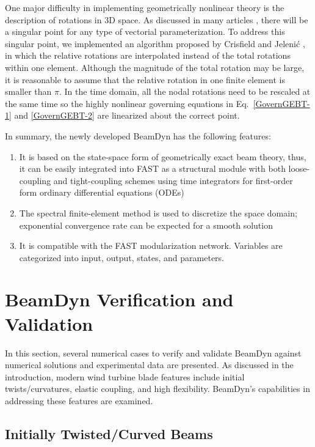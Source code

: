 \documentclass{aiaa-tc}
\begin{document}
One major difficulty in implementing geometrically nonlinear theory is the description of rotations in 3D space. As discussed in many articles \cite{Crisfield:1999,Bauchau:2010,Bottasso:1998}, there will be a singular point for any type of vectorial parameterization. To address this singular point, we implemented an algorithm proposed by Crisfield and Jeleni\'c \cite{Crisfield:1999}, in which the relative rotations are interpolated instead of the total rotations within one element. Although the magnitude of the total rotation may be large, it is reasonable to assume that the relative rotation in one finite element is smaller than $\pi$. In the time domain, all the nodal rotations need to be rescaled at the same time so the highly nonlinear governing equations in Eq.~\eqref{GovernGEBT-1} and \eqref{GovernGEBT-2} are linearized about the correct point.

In summary, the newly developed BeamDyn has the following features: 
\begin{enumerate}
    \item It is based on the state-space form of geometrically exact beam theory, thus, it can be easily integrated into FAST as a structural module with both loose-coupling and tight-coupling schemes using time integrators for first-order form ordinary differential equations (ODEs)
    \item The spectral finite-element method is used to discretize the space domain; exponential convergence rate can be expected for a smooth solution
    \item It is compatible with the FAST modularization network. Variables are categorized into input, output, states, and parameters.
\end{enumerate}

\section{BeamDyn Verification and Validation}
In this section, several numerical cases to verify and validate BeamDyn against numerical solutions and experimental data are presented. As discussed in the introduction, modern wind turbine blade features include initial twists/curvatures, elastic coupling, and high flexibility. BeamDyn's capabilities in addressing these features are examined.

\subsection{Initially Twisted/Curved Beams}
\end{document}
